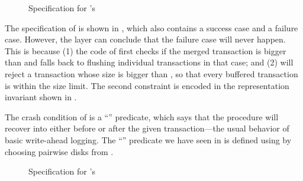 \begin{figure}[htb]
\begin{spec}
\end{spec}
\caption{Specification for \logapi's }
\label{fig:spec_log_flush}
\end{figure}

The specification of  is shown in
, which also contains a success case and a
failure case.  However, the \grouplog layer can conclude that the failure
case will never happen.  This is because (1) the code of 
first checks if the merged transaction is bigger than  and
falls back to flushing individual transactions in that case; and (2)
 will reject a transaction whose size is bigger than
, so that every buffered transaction is within the size
limit. The second constraint is encoded in the representation invariant
shown in .

The crash condition of  is a
``'' predicate, which says that the procedure
will recover into either before or after the given transaction---the usual
behavior of basic write-ahead logging.  The ``''
predicate we have seen in  is defined using
 by choosing pairwise disks from .

\begin{figure}[htb]
\begin{spec}
\end{spec}
\caption{Specification for \memlog's }
\label{fig:spec_applier_flush}
\end{figure}

